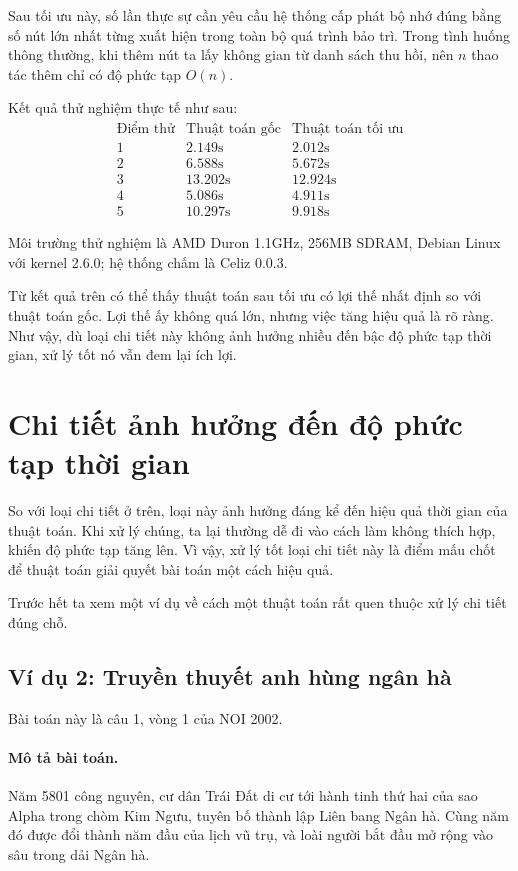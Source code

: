 \documentclass[11pt]{article}
\begin{document}
Sau tối ưu này, số lần thực sự cần yêu cầu hệ thống cấp phát bộ nhớ đúng bằng
số nút lớn nhất từng xuất hiện trong toàn bộ quá trình bảo trì. Trong tình
huống thông thường, khi thêm nút ta lấy không gian từ danh sách thu hồi, nên
$n$ thao tác thêm chỉ có độ phức tạp $O(n)$.

Kết quả thử nghiệm thực tế như sau:
\[
\begin{array}{c|c|c}
\text{Điểm thử} & \text{Thuật toán gốc} & \text{Thuật toán tối ưu}\\ \hline
1 & 2.149\text{s} & 2.012\text{s}\\
2 & 6.588\text{s} & 5.672\text{s}\\
3 & 13.202\text{s} & 12.924\text{s}\\
4 & 5.086\text{s} & 4.911\text{s}\\
5 & 10.297\text{s} & 9.918\text{s}
\end{array}
\]

Môi trường thử nghiệm là AMD Duron 1.1GHz, 256MB SDRAM, Debian Linux với
kernel 2.6.0; hệ thống chấm là Celiz 0.0.3.

Từ kết quả trên có thể thấy thuật toán sau tối ưu có lợi thế nhất định so với
thuật toán gốc. Lợi thế ấy không quá lớn, nhưng việc tăng hiệu quả là rõ
ràng. Như vậy, dù loại chi tiết này không ảnh hưởng nhiều đến bậc độ phức tạp
thời gian, xử lý tốt nó vẫn đem lại ích lợi.

\section{Chi tiết ảnh hưởng đến độ phức tạp thời gian}

So với loại chi tiết ở trên, loại này ảnh hưởng đáng kể đến hiệu quả thời
gian của thuật toán. Khi xử lý chúng, ta lại thường dễ đi vào cách làm không
thích hợp, khiến độ phức tạp tăng lên. Vì vậy, xử lý tốt loại chi tiết này là
điểm mấu chốt để thuật toán giải quyết bài toán một cách hiệu quả.

Trước hết ta xem một ví dụ về cách một thuật toán rất quen thuộc xử lý chi
tiết đúng chỗ.

\subsection{Ví dụ 2: Truyền thuyết anh hùng ngân hà}

Bài toán này là câu 1, vòng 1 của NOI 2002.

\paragraph{Mô tả bài toán.}
Năm 5801 công nguyên, cư dân Trái Đất di cư tới hành tinh thứ hai của sao
Alpha trong chòm Kim Ngưu, tuyên bố thành lập Liên bang Ngân hà. Cùng năm đó
được đổi thành năm đầu của lịch vũ trụ, và loài người bắt đầu mở rộng vào
sâu trong dải Ngân hà.
\end{document}
